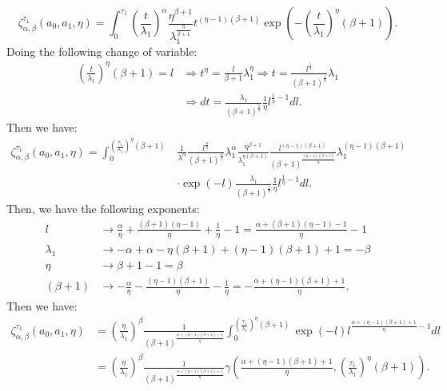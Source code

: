 \documentclass{article}
\begin{document}
\begin{equation*}
\zeta_{\alpha,\beta}^{\tau_1}\left(a_0,a_1,\eta\right)=\int_{0}^{\tau_1} \left(\frac{t}{\lambda_1}\right)^{\alpha} \frac{\eta^{\beta+1}}{\lambda_1^{\frac{\eta}{\beta+1}}}t^{(\eta-1)(\beta+1)}\exp\left(-\left(\frac{t}{\lambda_1}\right)^{\eta}(\beta+1)\right). 
\end{equation*}
Doing the following change of variable:
\begin{align*}
\left(\frac{t}{\lambda_1}\right)^{\eta}(\beta+1)=l & \Rightarrow t^{\eta}=\frac{l}{\beta+1}\lambda_1^{\eta} \Rightarrow t=\frac{l^{\frac{1}{\eta}}}{(\beta+1)^{\frac{1}{\eta}}}\lambda_1  \\
&\Rightarrow dt= \frac{\lambda_1}{(\beta+1)^{\frac{1}{\eta}}}\frac{1}{\eta}  l^{\frac{1}{\eta}-1}dl.
\end{align*}
Then we have:
\begin{align*}
\zeta_{\alpha,\beta}^{\tau_1}\left(a_0,a_1,\eta\right)=\int_0^{\left(\frac{\tau_1}{\lambda_1}\right)^{\eta}(\beta+1)} &\frac{1}{\lambda^{\alpha}}\frac{l^{\frac{\alpha}{\eta}}}{(\beta+1)^{\frac{\alpha}{\eta}}}\lambda_1^{\alpha} \frac{\eta^{\beta+1}}{\lambda_1^{\eta(\beta+1)}}\frac{l^{(\eta-1)(\beta+1)}}{(\beta+1)^{\frac{(\eta-1)(\beta+1)}{\eta}}}
\lambda_1^{(\eta-1)(\beta+1)}\\
& \cdot \exp\left(-l\right) \frac{\lambda_1}{(\beta+1)^{\frac{1}{\eta}}} \frac{1}{\eta} l^{\frac{1}{\eta}-1}dl.
\end{align*}
Then, we have the following exponents:
\begin{align*}
l &\rightarrow \frac{\alpha}{\eta}+ \frac{(\beta+1)(\eta-1)}{\eta}+\frac{1}{\eta}-1=\frac{\alpha+(\beta+1)(\eta-1)-1}{\eta}-1
\\
\lambda_1 &\rightarrow -\alpha+\alpha -\eta(\beta+1) + (\eta-1)(\beta+1)+1=-\beta
\\
\eta & \rightarrow \beta+1-1=\beta
\\
(\beta+1) & \rightarrow -\frac{\alpha}{\eta} -\frac{(\eta-1)(\beta+1)}{\eta} - \frac{1}{\eta} = -\frac{\alpha + (\eta-1)(\beta+1)+1}{\eta}.
\end{align*}
Then we have:
\begin{align*}
\zeta_{\alpha,\beta}^{\tau_1}\left(a_0,a_1,\eta\right)&=\left(\frac{\eta}{\lambda_1}\right)^\beta \frac{1}{(\beta+1)^{\frac{\alpha+(\eta-1)(\beta+1)+1}{\eta}}}\int_0^{\left(\frac{\tau_1}{\lambda_1}\right)^{\eta}(\beta+1)} \exp\left(-l\right) l^{\frac{\alpha+(\eta-1)(\beta+1)+1}{\eta}-1} dl
\\
&=\left(\frac{\eta}{\lambda_1}\right)^\beta \frac{1}{(\beta+1)^{\frac{\alpha+(\eta-1)(\beta+1)+1}{\eta}}}\gamma\left(\frac{\alpha+(\eta-1)(\beta+1)+1}{\eta},\left(\frac{\tau_1}{\lambda_1}\right)^{\eta}(\beta+1)\right).
\end{align*}
\end{document}
